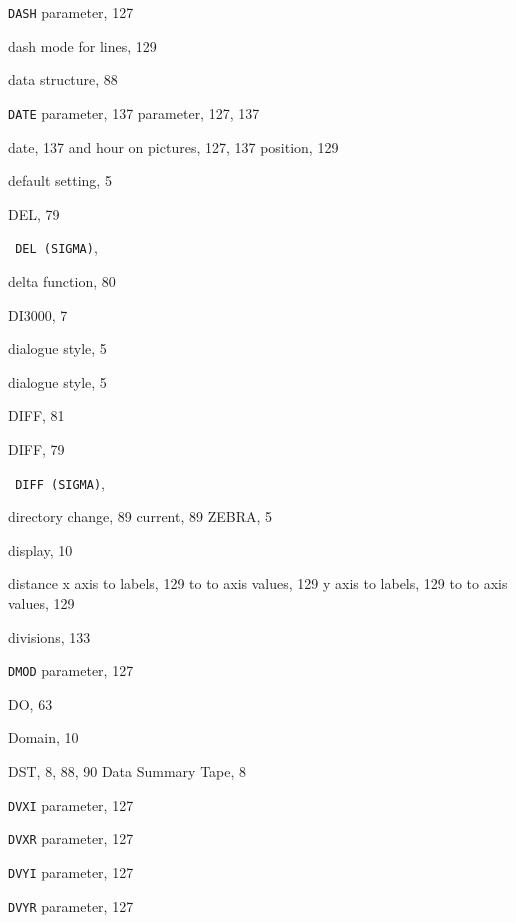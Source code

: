 \begin{theindex}
  \indexspace

  \item {\tt DASH}
     parameter, 127
  \item dash mode for lines, 129
  \item data structure, 88
  \item {\tt DATE}
     parameter, 137
     parameter, 127, 137
  \item date, 137
    \subitem and hour on pictures, 127, 137
    \subitem position, 129
  \item default setting, 5
  \item {\ttfamily  DEL}, 79
  \item \texttt  { DEL \textrm  {(SIGMA)}}, 
  \item delta function, 80
  \item DI3000, 7
  \item dialogue
    \subitem style, 5
  \item dialogue style, 5
  \item DIFF, 81
  \item {\ttfamily  DIFF}, 79
  \item \texttt  { DIFF \textrm  {(SIGMA)}}, 
  \item directory
    \subitem change, 89
    \subitem current, 89
    \subitem ZEBRA, 5
  \item display, 10
  \item distance
    \subitem x axis
      \subsubitem to labels, 129
      \subsubitem to to axis values, 129
    \subitem y axis
      \subsubitem to labels, 129
      \subsubitem to to axis values, 129
  \item divisions, 133
  \item {\tt DMOD}
     parameter, 127
  \item {\ttfamily  DO}, 63
  \item Domain, 10
  \item DST, 8, 88, 90
    \subitem Data Summary Tape, 8
  \item {\tt DVXI}
     parameter, 127
  \item {\tt DVXR}
     parameter, 127
  \item {\tt DVYI}
     parameter, 127
  \item {\tt DVYR}
     parameter, 127

  \indexspace


\end{theindex}
